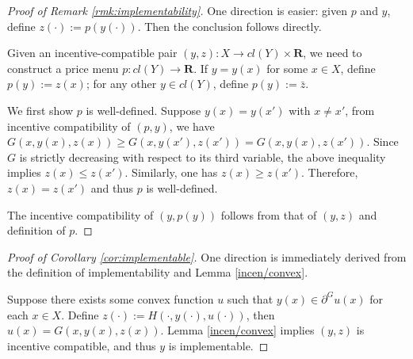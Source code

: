 \documentclass[a4paper, 11pt]{amsart}
\numberwithin{equation}{section}
\theoremstyle{plain}
\theoremstyle{definition}
\theoremstyle{remark}
\newcommand{\R}{\mathbf{R}}
\begin{document}
\begin{proof}[Proof of Remark \ref{rmk:implementability}]
	One direction is easier: given $p$ and $y$, define $z(\cdot):= p(y(\cdot))$. Then the conclusion follows directly. \medskip
	
	Given an incentive-compatible pair $(y, z): X \longrightarrow cl(Y) \times \R$, we need to construct a price menu $p: cl(Y)\longrightarrow \R$. If $y= y(x)$ for some $x\in X$, define $p(y):= z(x)$; for any other $y \in cl(Y)$, define $p(y) := \bar{z}$. \medskip
	
	We first show $p$ is well-defined. Suppose $y(x) = y(x')$ with $x\ne x'$, from incentive compatibility of $(p,y)$, we have $G(x,y(x), z(x)) \ge G(x, y(x'), z(x')) = G(x, y(x), z(x'))$. Since $G$ is strictly decreasing with respect to its third variable, the above inequality implies $z(x) \le z(x')$. Similarly, one has $z(x) \ge z(x')$. Therefore, $z(x) = z(x')$ and thus $p$ is well-defined. \medskip
	
	The incentive compatibility of $(y, p(y))$ follows from that of $(y, z)$ and definition of $p$.
\end{proof}
\vspace{0.3cm}
\begin{proof}[Proof of Corollary \ref{cor:implementable}]
	One direction is immediately derived from the definition of implementability and Lemma \ref{incen/convex}.\medskip
	
	Suppose there exists some convex function $u$ such that $y(x) \in \partial^G u(x)$ for each $x \in X$. Define $z(\cdot):= H(\cdot, y(\cdot), u(\cdot))$, then $u(x) = G(x, y(x), z(x))$.
	Lemma \ref{incen/convex} implies $(y, z)$ is incentive compatible, and thus $y$ is implementable.
\end{proof}
\vspace{0.3cm}
\end{document}
